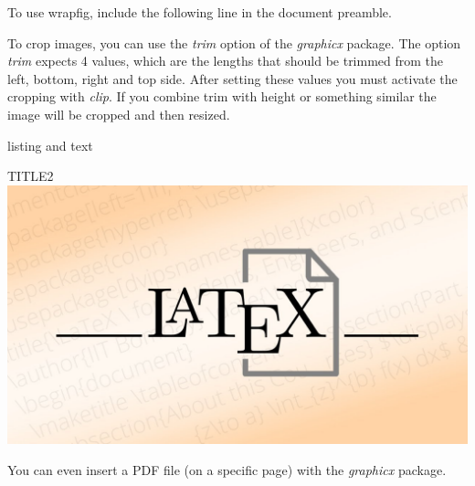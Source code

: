 \documentclass[]{myHOWTO-V001}
\begin{document}
To use wrapfig, include the following line in the document preamble.

\begin{myTEXEXdoclst}{}{}
\usepackage{wrapfig}
\end{myTEXEXdoclst}

\newpage

To crop images, you can use the \emph{trim} option of the \emph{graphicx} package. The option \emph{trim} expects 4 values, which are the lengths that should be trimmed from the left, bottom, right and top side. After setting these values you must activate the cropping with \emph{clip}. If you combine trim with height or something similar the image will be cropped and then resized.

\begin{myTEXEXdoclst}{}{listing and text}
\centering
\begin{myFIGlst}{TITLE2}{}
	\includegraphics[scale=0.15,trim=80mm 80mm 80mm 60mm,clip]{LaTeX.jpg}
\end{myFIGlst}
\end{myTEXEXdoclst}

You can even insert a PDF file (on a specific page) with the \emph{graphicx} package.
\end{document}
